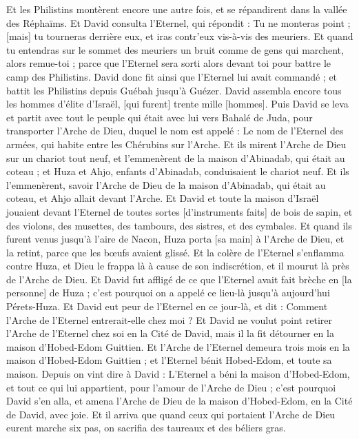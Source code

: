 \begin{multicols}{2}
Et les Philistins montèrent encore une autre fois, et se répandirent dans la vallée des Réphaïms.
Et David consulta l'Eternel, qui répondit : Tu ne monteras point ; [mais] tu tourneras derrière eux, et iras contr'eux vis-à-vis des meuriers.
Et quand tu entendras sur le sommet des meuriers un bruit comme de gens qui marchent, alors remue-toi ; parce que l'Eternel sera sorti alors devant toi pour battre le camp des Philistins.
David donc fit ainsi que l'Eternel lui avait commandé ; et battit les Philistins depuis Guébah jusqu'à Guézer.
\VerseOne{}David assembla encore tous les hommes d'élite d'Israël, [qui furent] trente mille [hommes].
Puis David se leva et partit avec tout le peuple qui était avec lui vers Bahalé de Juda, pour transporter l'Arche de Dieu, duquel le nom est appelé : Le nom de l'Eternel des armées, qui habite entre les Chérubins sur l'Arche.
Et ils mirent l'Arche de Dieu sur un chariot tout neuf, et l'emmenèrent de la maison d'Abinadab, qui était au coteau ; et Huza et Ahjo, enfants d'Abinadab, conduisaient le chariot neuf.
Et ils l'emmenèrent, savoir l'Arche de Dieu de la maison d'Abinadab, qui était au coteau, et Ahjo allait devant l'Arche.
Et David et toute la maison d'Israël jouaient devant l'Eternel de toutes sortes [d'instruments faits] de bois de sapin, et des violons, des musettes, des tambours, des sistres, et des cymbales.
Et quand ils furent venus jusqu'à l'aire de Nacon, Huza porta [sa main] à l'Arche de Dieu, et la retint, parce que les bœufs avaient glissé.
Et la colère de l'Eternel s'enflamma contre Huza, et Dieu le frappa là à cause de son indiscrétion, et il mourut là près de l'Arche de Dieu.
Et David fut affligé de ce que l'Eternel avait fait brèche en [la personne] de Huza ; c'est pourquoi on a appelé ce lieu-là jusqu'à aujourd'hui Pérets-Huza.
Et David eut peur de l'Eternel en ce jour-là, et dit : Comment l'Arche de l'Eternel entrerait-elle chez moi ?
Et David ne voulut point retirer l'Arche de l'Eternel chez soi en la Cité de David, mais il la fit détourner en la maison d'Hobed-Edom Guittien.
Et l'Arche de l'Eternel demeura trois mois en la maison d'Hobed-Edom Guittien ; et l'Eternel bénit Hobed-Edom, et toute sa maison.
Depuis on vint dire à David : L'Eternel a béni la maison d'Hobed-Edom, et tout ce qui lui appartient, pour l'amour de l'Arche de Dieu ; c'est pourquoi David s'en alla, et amena l'Arche de Dieu de la maison d'Hobed-Edom, en la Cité de David, avec joie.
Et il arriva que quand ceux qui portaient l'Arche de Dieu eurent marche six pas, on sacrifia des taureaux et des béliers gras.

\end{multicols}
